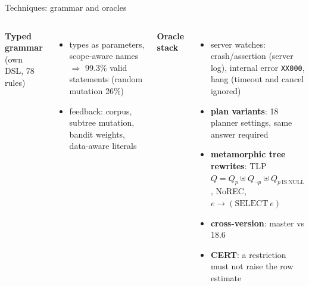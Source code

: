 \documentclass[aspectratio=169,10pt]{beamer}
\begin{document}
\begin{frame}{Techniques: grammar and oracles}
\small
\begin{columns}[T]
\textbf{Typed grammar} (own DSL, 78 rules)
\begin{itemize}
  \item types as parameters, scope-aware names $\Rightarrow$ \alert{99.3\%} valid statements (random mutation 26\%)
  \item feedback: corpus, subtree mutation, bandit weights, data-aware literals
\end{itemize}
\textbf{Oracle stack}
\begin{itemize}
  \item server watches: crash/assertion (server log), internal error \texttt{XX000}, hang (timeout and cancel ignored)
  \item \textbf{plan variants}: 18 planner settings, same answer required
  \item \textbf{metamorphic tree rewrites}: TLP $Q = Q_p \uplus Q_{\neg p} \uplus Q_{p\ \mathrm{IS\ NULL}}$, NoREC, $e \rightarrow (\mathrm{SELECT}\ e)$
  \item \textbf{cross-version}: master vs 18.6
  \item \textbf{CERT}: a restriction must not raise the row estimate
\end{itemize}
\end{columns}
\end{frame}
\end{document}
